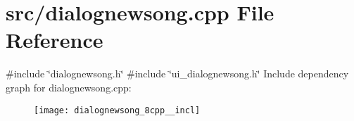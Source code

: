 \section{src/dialognewsong.cpp File Reference}
\label{dialognewsong_8cpp}
{\ttfamily \#include \char`\"{}dialognewsong.\+h\char`\"{}}\newline
{\ttfamily \#include \char`\"{}ui\+\_\+dialognewsong.\+h\char`\"{}}\newline
Include dependency graph for dialognewsong.\+cpp\+:\nopagebreak
\begin{figure}[H]
\begin{center}
\leavevmode
\texttt{[image: dialognewsong\_8cpp\_\_incl]}
\end{center}
\end{figure}
